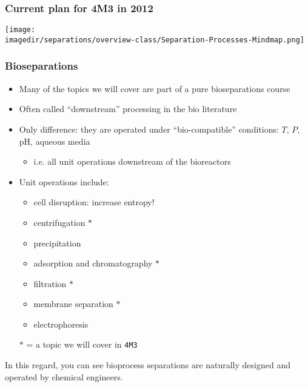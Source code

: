 \begin{frame}\frametitle{Current plan for 4M3 in 2012}
	\begin{center}
		\texttt{[image: \\imagedir/separations/overview-class/Separation-Processes-Mindmap.png]}
	\end{center}
\end{frame}

\begin{frame}\frametitle{Bioseparations}
	\begin{itemize}
		\item	Many of the topics we will cover are part of a pure bioseparations course
		\item	Often called ``downstream'' processing in the bio literature
		\item	Only difference: they are operated under ``bio-compatible'' conditions: $T$, $P$, pH, aqueous media
		\begin{itemize}
			\item	i.e. all unit operations downstream of the bioreactors
		\end{itemize}
		\item	Unit operations include:
		\begin{itemize}
			\item	cell disruption: increase entropy!
			\item	centrifugation $\ast$
			\item	precipitation
			\item	adsorption and chromatography $\ast$
			\item	filtration $\ast$
			\item	membrane separation $\ast$
			\item	electrophoresis
		\end{itemize}
		\vspace{12pt}
		$\ast$ = a topic we will cover in \texttt{4M3}
	\end{itemize}
	\vspace{12pt}
	In this regard, you can see bioprocess separations are naturally designed and operated by chemical engineers.
\end{frame}

